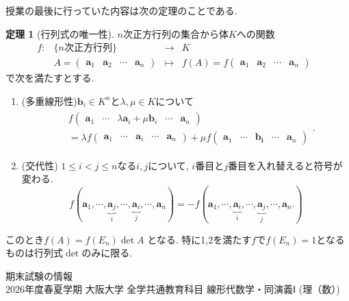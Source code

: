 \documentclass[dvipdfmx,a4paper,11pt]{article} %
\theoremstyle{definition}
\newtheorem{thm}{定理}
\begin{document}
 授業の最後に行っていた内容は次の定理のことである. 
  \begin{thm}[行列式の唯一性]
    \label{thm-det}
    $n$次正方行列の集合から体$K$への関数
    $$
\begin{array}{ccccc}
f: &\{\text{$n$次正方行列} \}& \rightarrow & K& \\
&
A
=
    \begin{pmatrix}
    \bm{a}_1&\bm{a}_2&\cdots&\bm{a}_n
    \end{pmatrix}
 & 
 \longmapsto & 
 f(A)=f\begin{pmatrix}
    \bm{a}_1&\bm{a}_2&\cdots&\bm{a}_n
    \end{pmatrix}
 &
\end{array}
$$
で次を満たすとする.
       \begin{enumerate}
    \setlength{\parskip}{0cm} 
  \setlength{\itemsep}{0cm}
\item (多重線形性)$\bm{b}_{i} \in K^n$と$\lambda, \mu \in K$について
\begin{align*}
\begin{split}
&f\begin{pmatrix}
    \bm{a}_1&\cdots&\lambda\bm{a}_i+\mu\bm{b}_i&\cdots&\bm{a}_n
    \end{pmatrix} \\
&=
\lambda f\begin{pmatrix}
    \bm{a}_1&\cdots&\bm{a}_i&\cdots&\bm{a}_n
    \end{pmatrix}
+
\mu f\begin{pmatrix}
    \bm{a}_1&\cdots&\bm{b_i}&\cdots&\bm{a}_n
    \end{pmatrix}
    \end{split}.
\end{align*}
\item (交代性) $1\le i< j \le n$なる$i,j$について, $i$番目と$j$番目を入れ替えると符号が変わる. 
$$
f(
    \bm{a}_1, \cdots, \underbrace{\bm{a}_j}_{i}, \cdots , \underbrace{\bm{a}_i}_{j}, \cdots, \bm{a}_n
)
=
-f(
    \bm{a}_1, \cdots, \underbrace{\bm{a}_i}_{i}, \cdots , \underbrace{\bm{a}_j}_{j}, \cdots, \bm{a}_n.
)
$$
  \end{enumerate}
 このとき$ f(A) = f(E_n) \det A$
 となる.
 特に1,2を満たす$f$で$f(E_n)=1$となるものは行列式$\det$のみに限る. 
     \end{thm}
 

 
\newpage

\begin{center}
{\LARGE 期末試験の情報 } \\
2026年度春夏学期 大阪大学 全学共通教育科目 線形代数学・同演義Ⅰ (理（数）)
\end{center}
\end{document}
